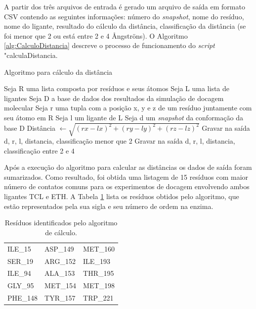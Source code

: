 % 
%
%       

A partir dos três arquivos de entrada é gerado um arquivo de saída em formato CSV contendo as seguintes informações: número do \emph{snapshot}, nome do resíduo, nome do ligante, resultado do cálculo da distância, classificação da distância (se foi menor que 2 ou está entre 2 e 4 {\AA}ngstr\"ons).
O Algoritmo \ref{alg:CalculoDistancia} descreve o processo de funcionamento do \emph{script} "calculaDistancia.

\begin{algorithm}[H]
\caption{Algoritmo para cálculo da distância}
\label{alg:CalculoDistancia}
{\fontsize{10}{10}\selectfont
\begin{algorithmic}[1]
	\STATE Seja R uma lista composta por resíduos e seus átomos
	\STATE Seja L uma lista de ligantes
	\STATE Seja D a base de dados dos resultados da simulação de docagem molecular
	\STATE Seja r uma tupla com a posição x, y e z de um resíduo juntamente com seu átomo em R
	\STATE Seja l um ligante de L
	\STATE Seja d um \emph{snapshot} da conformação da base D
			\STATE Distância $\gets \sqrt{(rx - lx)^{2} +(ry - ly)^{2} + (rz - lz)^{2}}$ 
			\ENDIF
				\STATE Gravar na saída d, r, l, distancia, classificação menor que 2
				\ELSE
				\STATE Gravar na saída d, r, l, distancia, classificação entre 2 e 4
				\ENDIF
			\ENDIF
			\ENDFOR
		\ENDFOR
	\ENDFOR
\end{algorithmic}
}
\end{algorithm}

% 
%
%       

Após a execução do algoritmo para calcular as distâncias os dados de saída foram sumarizados. Como resultado, foi obtida uma listagem de 15 resíduos com maior número de contatos comuns para os experimentos de docagem envolvendo ambos ligantes TCL e ETH. A Tabela \ref{tab:listaProvavelRelevantes} lista os resíduos obtidos pelo algoritmo, que estão representados pela sua sigla e seu número de ordem na enzima.

\begin{table}[h]
	\caption{Resíduos identificados pelo algoritmo de cálculo.}
	\label{tab:listaProvavelRelevantes}
	\centering
	\begin{tabular}{@{}lll@{}}
	ILE\_15  & ASP\_149 & MET\_160 \\
	SER\_19  & ARG\_152 & ILE\_193 \\
	ILE\_94  & ALA\_153 & THR\_195 \\
	GLY\_95  & MET\_154 & MET\_198 \\
	PHE\_148 & TYR\_157 & TRP\_221 \\
	\end{tabular}
\end{table}

